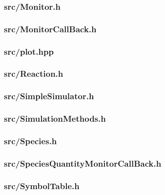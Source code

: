 \subsubsection{src/Monitor.h}

\newpage
\subsubsection{src/MonitorCallBack.h}

\newpage
\subsubsection{src/plot.hpp}

\newpage
\subsubsection{src/Reaction.h}

\newpage
\subsubsection{src/SimpleSimulator.h}

\newpage
\subsubsection{src/SimulationMethods.h}

\newpage
\subsubsection{src/Species.h}

\newpage
\subsubsection{src/SpeciesQuantityMonitorCallBack.h}

\newpage
\subsubsection{src/SymbolTable.h}

\newpage
